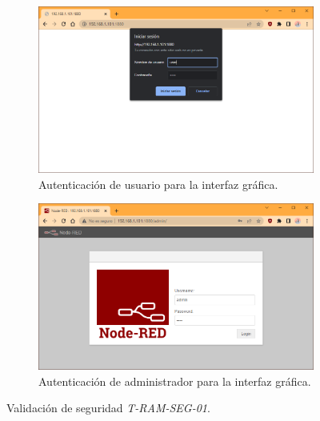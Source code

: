 \begin{figure}[H]
\centering
    	\begin{subfigure}{0.49\textwidth}
        	\centering
        	\includegraphics[width=\linewidth]{ImagenesValidacion del prototipo/t-ram-seg-01-1}		
			\caption{Autenticación de usuario para la interfaz gráfica.}
        \end{subfigure}\hfill
        \begin{subfigure}{0.49\textwidth}
        	\centering
        	\includegraphics[width=\linewidth]{ImagenesValidacion del prototipo/t-ram-seg-01-2}
        	\caption{Autenticación de administrador para la interfaz gráfica.}
        \end{subfigure}
	\caption{Validación de seguridad \textit{T-RAM-SEG-01}.}
\end{figure}


%

